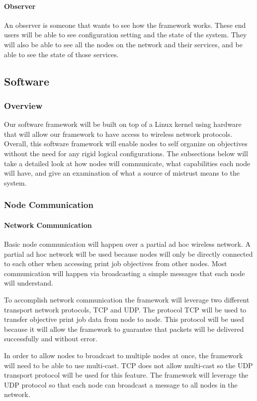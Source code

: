 \paragraph{Observer}
An observer is someone that wants to see how the framework works. These end users will be able to see configuration setting and the state of the system. They will also be able to see all the nodes on the network and their services, and be able to see the state of those services.

\subsection{Software}
\subsubsection{Overview}
Our software framework will be built on top of a Linux kernel using hardware that will allow our framework to have access to wireless network protocols. Overall, this software framework will enable nodes to self organize on objectives without the need for any rigid logical configurations. The subsections below will take a detailed look at how nodes will communicate, what capabilities each node will have, and give an examination of what a source of mistrust means to the system.

\subsubsection{Node Communication}
\paragraph{Network Communication}
Basic node communication will happen over a partial ad hoc wireless network. A partial ad hoc network will be used because nodes will only be directly connected to each other when accessing print job objectives from other nodes. Most communication will happen via broadcasting a simple messages that each node will understand.

To accomplish network communication the framework will leverage two different transport network protocols, TCP and UDP. The protocol TCP will be used to transfer objective print job data from node to node. This protocol will be used because it will allow the framework to guarantee that packets will be delivered successfully and without error. 

In order to allow nodes to broadcast to multiple nodes at once, the framework will need to be able to use multi-cast. TCP does not allow multi-cast so the UDP transport protocol will be used for this feature. The framework will leverage the UDP protocol so that each node can broadcast a message to all nodes in the network. 

